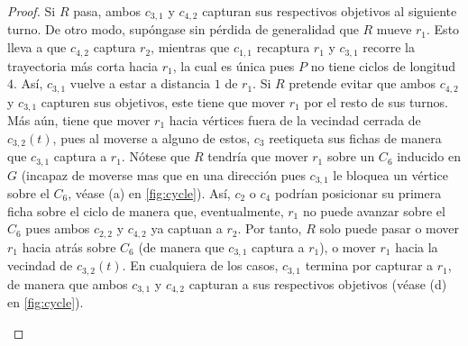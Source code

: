 \begin{proof}
    Si $R$ pasa, ambos $c_{3,1}$ y $c_{4,2}$ capturan sus respectivos objetivos
    al siguiente turno. De otro modo, sup\'ongase sin p\'erdida de generalidad
    que $R$ mueve $r_1$. Esto lleva a que $c_{4,2}$ captura $r_2$, mientras que
    $c_{1,1}$ recaptura $r_1$ y $c_{3,1}$ recorre la trayectoria m\'as corta
    hacia $r_1$, la cual es \'unica pues $P$ no tiene ciclos de longitud $4$.
    As\'i, $c_{3,1}$ vuelve a estar a distancia $1$ de $r_1$. Si $R$ pretende
    evitar que ambos $c_{4,2}$ y $c_{3,1}$ capturen sus objetivos, este tiene
    que mover $r_1$ por el resto de sus turnos. M\'as a\'un, tiene que mover
    $r_1$ hacia v\'ertices fuera de la vecindad cerrada de $c_{3,2}(t)$, pues al
    moverse a alguno de estos, $c_3$ reetiqueta sus fichas de manera que
    $c_{3,1}$ captura a $r_1$. N\'otese que $R$ tendr\'ia que mover $r_1$ sobre
    un $C_6$ inducido en $G$ (incapaz de moverse mas que en una direcci\'on pues
    $c_{3,1}$ le bloquea un v\'ertice sobre el $C_6$, v\'ease (a) en
    \cref{fig:cycle}). As\'i, $c_2$ o $c_4$ podr\'ian posicionar su primera
    ficha sobre el ciclo de manera que, eventualmente, $r_1$ no puede avanzar
    sobre el $C_6$ pues ambos $c_{2,2}$ y $c_{4,2}$ ya captuan a $r_2$. Por
    tanto, $R$ solo puede pasar o mover $r_1$ hacia atr\'as sobre $C_6$ (de
    manera que $c_{3,1}$ captura a $r_1$), o mover $r_1$ hacia la vecindad de
    $c_{3,2}(t)$. En cualquiera de los casos, $c_{3,1}$ termina por capturar a
    $r_1$, de manera que ambos $c_{3,1}$ y $c_{4,2}$ capturan a sus respectivos
    objetivos (v\'ease (d) en \cref{fig:cycle}).

    \begin{figure}[!htbp]
        \begin{tcbitemize}[raster columns=2, raster equal height, enhanced,
            colback=Black!5!white,colframe=Grey!75!black, attach title to upper,
            phantom={\setcounter{myrasternum}{\thetcbrasternum}},
            title={(\alph{myrasternum})\enspace}, halign lower=center, halign
            upper = left, lower separated=false, middle=0mm, boxsep=0mm,
            leftupper=2mm, left=2mm, right=2mm, fonttitle=\bfseries,
            coltitle=black, raster column skip=1mm,raster halign=center, raster
            row skip=1mm]

            \tcbitem
                \tcblower
\end{tcbitemize}
\end{figure}
\end{proof}
